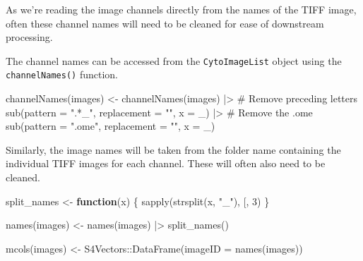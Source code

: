 \documentclass[
  letterpaper,
  DIV=11,
  numbers=noendperiod]{scrreprt}
\newenvironment{Shaded}{\begin{snugshade}}{\end{snugshade}}
\newcommand{\AttributeTok}[1]{\textcolor[rgb]{0.40,0.45,0.13}{#1}}
\newcommand{\CommentTok}[1]{\textcolor[rgb]{0.37,0.37,0.37}{#1}}
\newcommand{\ControlFlowTok}[1]{\textcolor[rgb]{0.00,0.23,0.31}{\textbf{#1}}}
\newcommand{\DecValTok}[1]{\textcolor[rgb]{0.68,0.00,0.00}{#1}}
\newcommand{\FunctionTok}[1]{\textcolor[rgb]{0.28,0.35,0.67}{#1}}
\newcommand{\NormalTok}[1]{\textcolor[rgb]{0.00,0.23,0.31}{#1}}
\newcommand{\OtherTok}[1]{\textcolor[rgb]{0.00,0.23,0.31}{#1}}
\newcommand{\SpecialCharTok}[1]{\textcolor[rgb]{0.37,0.37,0.37}{#1}}
\newcommand{\StringTok}[1]{\textcolor[rgb]{0.13,0.47,0.30}{#1}}
\begin{document}
As we're reading the image channels directly from the names of the TIFF
image, often these channel names will need to be cleaned for ease of
downstream processing.

The channel names can be accessed from the \texttt{CytoImageList} object
using the \texttt{channelNames()} function.

\begin{Shaded}
\begin{Highlighting}[]
\FunctionTok{channelNames}\NormalTok{(images) }\OtherTok{\textless{}{-}} \FunctionTok{channelNames}\NormalTok{(images) }\SpecialCharTok{|\textgreater{}}
                          \CommentTok{\# Remove preceding letters}
                          \FunctionTok{sub}\NormalTok{(}\AttributeTok{pattern =} \StringTok{".*\_"}\NormalTok{, }\AttributeTok{replacement =} \StringTok{""}\NormalTok{, }\AttributeTok{x =}\NormalTok{ \_) }\SpecialCharTok{|\textgreater{}} 
                          \CommentTok{\# Remove the .ome}
                          \FunctionTok{sub}\NormalTok{(}\AttributeTok{pattern =} \StringTok{".ome"}\NormalTok{, }\AttributeTok{replacement =} \StringTok{""}\NormalTok{, }\AttributeTok{x =}\NormalTok{ \_)}
\end{Highlighting}
\end{Shaded}

Similarly, the image names will be taken from the folder name containing
the individual TIFF images for each channel. These will often also need
to be cleaned.

\begin{Shaded}
\begin{Highlighting}[]
\NormalTok{split\_names }\OtherTok{\textless{}{-}} \ControlFlowTok{function}\NormalTok{(x) \{}
  \FunctionTok{sapply}\NormalTok{(}\FunctionTok{strsplit}\NormalTok{(x, }\StringTok{"\_"}\NormalTok{), }\StringTok{\textasciigrave{}}\AttributeTok{[}\StringTok{\textasciigrave{}}\NormalTok{, }\DecValTok{3}\NormalTok{)}
\NormalTok{\}}

\FunctionTok{names}\NormalTok{(images) }\OtherTok{\textless{}{-}} \FunctionTok{names}\NormalTok{(images) }\SpecialCharTok{|\textgreater{}} \FunctionTok{split\_names}\NormalTok{()}

\FunctionTok{mcols}\NormalTok{(images) }\OtherTok{\textless{}{-}}\NormalTok{ S4Vectors}\SpecialCharTok{::}\FunctionTok{DataFrame}\NormalTok{(}\AttributeTok{imageID =} \FunctionTok{names}\NormalTok{(images))}
\end{Highlighting}
\end{Shaded}
\end{document}

